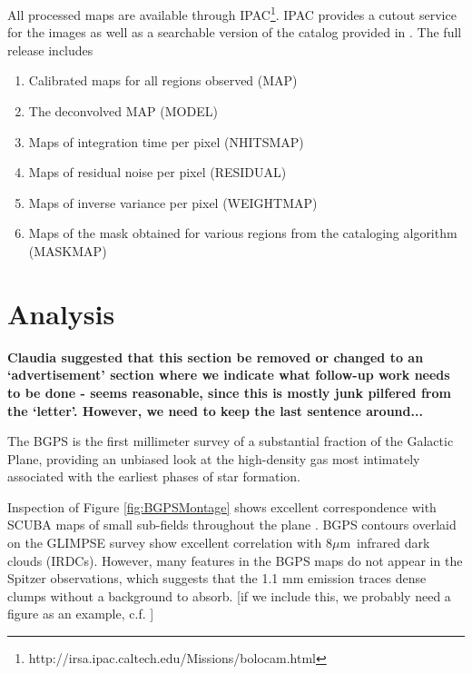 \documentclass[12pt,preprint]{aastex}
\newcommand{\mum}{\ensuremath{\mu \mathrm{m}}}
\begin{document}
All processed maps are available through
IPAC\footnote{http://irsa.ipac.caltech.edu/Missions/bolocam.html}.
IPAC provides a cutout service for the images as well as a searchable
version of the catalog provided in \citet{rosolowsky09}.  The full
release includes
\begin{enumerate}
\item Calibrated maps for all regions observed (MAP)
\item The deconvolved MAP (MODEL)
\item Maps of integration time per pixel (NHITSMAP)
\item Maps of residual noise per pixel (RESIDUAL)
\item Maps of inverse variance per pixel (WEIGHTMAP)
\item Maps of the mask obtained for various regions from the cataloging algorithm (MASKMAP) \citep{rosolowsky09}
\end{enumerate}


\section{Analysis}
\label{sec:Analysis}

{\bf Claudia suggested that this section be removed or changed to an `advertisement' section
where we indicate what follow-up work needs to be done - seems reasonable, since this
is mostly junk pilfered from the `letter'.  However, we need to keep the last sentence around...}

The BGPS is the first millimeter survey of a substantial fraction
of the Galactic Plane, providing an unbiased look at the high-density
gas most intimately associated with the earliest phases of star
formation.  

Inspection of Figure \ref{fig:BGPSMontage} shows excellent
correspondence with SCUBA maps of small sub-fields throughout the
plane \citep{difrancesco08}.  BGPS contours overlaid on the GLIMPSE
survey \citep{benjamin03} show excellent correlation with 8\mum\
infrared dark clouds (IRDCs).  However, many features in the BGPS maps
do not appear in the Spitzer observations, which suggests that the 1.1
mm emission traces dense clumps without a background to absorb.  [if we
include this, we probably need a figure as an example, c.f. \citet{shuller09}]
\end{document}

